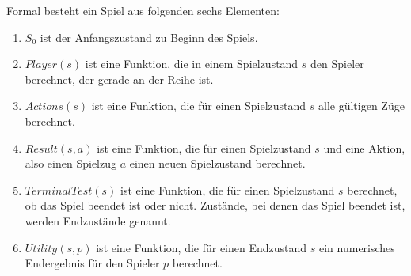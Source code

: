 Formal besteht ein Spiel aus folgenden sechs Elementen:
\begin{enumerate}
    \item $S_0$ ist der Anfangszustand zu Beginn des Spiels.
    \item $Player(s)$ ist eine Funktion, die in einem Spielzustand $s$ den Spieler berechnet, der gerade an der Reihe
    ist.
    \item $Actions(s)$ ist eine Funktion, die für einen Spielzustand $s$ alle gültigen Züge berechnet.
    \item $Result(s, a)$ ist eine Funktion, die für einen Spielzustand $s$ und eine Aktion, also einen Spielzug $a$
    einen neuen Spielzustand berechnet.
    \item $TerminalTest(s)$ ist eine Funktion, die für einen Spielzustand $s$ berechnet, ob das Spiel beendet ist oder
    nicht. Zustände, bei denen das Spiel beendet ist, werden Endzustände genannt.
    \item $Utility(s, p)$ ist eine Funktion, die für einen Endzustand $s$ ein numerisches Endergebnis für den Spieler
    $p$ berechnet.
\end{enumerate}
